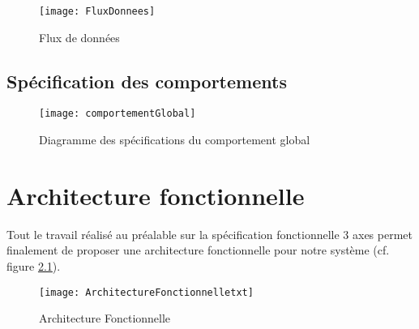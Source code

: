 \begin{figure}[h]
  \centering
  \texttt{[image: FluxDonnees]}
  \caption{Flux de données}
  \label{fig:fluxDonnees}
\end{figure}

\section{Spécification des comportements}

\begin{figure}[h]
  \centering
  \texttt{[image: comportementGlobal]}
  \caption{Diagramme des spécifications du comportement global}
  \label{fig:comportementGlobal}
\end{figure}

\chapter{Architecture fonctionnelle}

Tout le travail réalisé au préalable sur la spécification fonctionnelle 3 axes permet finalement de proposer une architecture fonctionnelle pour notre système (cf. figure \ref{fig:archiFonctionnelle}).
 
\begin{figure}[h]
  \centering
  \texttt{[image: ArchitectureFonctionnelletxt]}
  \caption{Architecture Fonctionnelle}
  \label{fig:archiFonctionnelle}
\end{figure}

